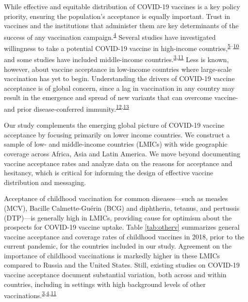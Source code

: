 \documentclass[
  12pt,
]{article}
\begin{document}
While effective and equitable distribution of COVID-19 vaccines is a key policy priority, ensuring the population's acceptance is equally important. Trust in vaccines and the institutions that administer them are key determinants of the success of any vaccination campaign.\textsuperscript{\protect\hyperlink{ref-defigueiredo2020lancet}{4}} Several studies have investigated willingness to take a potential COVID-19 vaccine in high-income countries,\textsuperscript{\protect\hyperlink{ref-boyon2020ipsos}{5}--\protect\hyperlink{ref-fisher2020attitudes}{10}} and some studies have included middle-income countries.\textsuperscript{\protect\hyperlink{ref-wouters2021challenges}{3},\protect\hyperlink{ref-lazarus2020nature}{11}} Less is known, however, about vaccine acceptance in low-income countries where large-scale vaccination has yet to begin. Understanding the drivers of COVID-19 vaccine acceptance is of global concern, since a lag in vaccination in any country may result in the emergence and spread of new variants that can overcome vaccine- and prior disease-conferred immunity.\textsuperscript{\protect\hyperlink{ref-ong2021lack}{12},\protect\hyperlink{ref-lancettask}{13}}

Our study complements the emerging global picture of COVID-19 vaccine acceptance by focusing primarily on lower income countries. We construct a sample of low- and middle-income countries (LMICs) with wide geographic coverage across Africa, Asia and Latin America. We move beyond documenting vaccine acceptance rates and analyze data on the reasons for acceptance and hesitancy, which is critical for informing the design of effective vaccine distribution and messaging.

Acceptance of childhood vaccination for common diseases---such as measles (MCV), Bacille Calmette-Guérin (BCG) and diphtheria, tetanus, and pertussis (DTP)---is generally high in LMICs, providing cause for optimism about the prospects for COVID-19 vaccine uptake. Table \ref{tab:otherv} summarizes general vaccine acceptance and coverage rates of childhood vaccines in 2018, prior to the current pandemic, for the countries included in our study. Agreement on the importance of childhood vaccinations is markedly higher in these LMICs compared to Russia and the United States. Still, existing studies on COVID-19 vaccine acceptance document substantial variation, both across and within countries, including in settings with high background levels of other vaccinations.\textsuperscript{\protect\hyperlink{ref-wouters2021challenges}{3},\protect\hyperlink{ref-defigueiredo2020lancet}{4},\protect\hyperlink{ref-lazarus2020nature}{11}}
\end{document}
